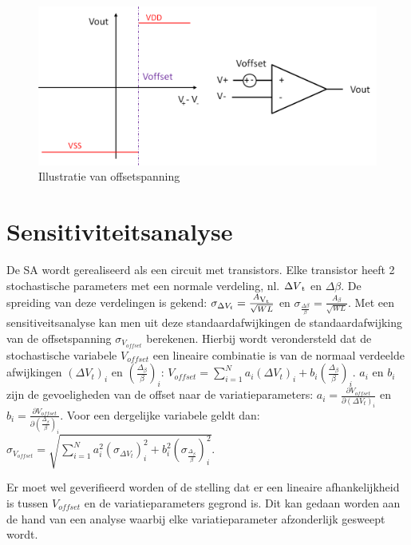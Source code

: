 \begin{figure}
  \centering
  \includegraphics[scale=0.4]{../fig/hfdstk-sensamp-offset.png}
  \caption[SA offsetspanning]{Illustratie van offsetspanning}
  \label{fig:offset}
\end{figure}

\section{Sensitiviteitsanalyse}
De SA wordt gerealiseerd als een circuit met transistors. Elke transistor heeft 2 stochastische parameters met een normale verdeling, nl. $\Delta V\textsubscript{t}$ en $\Delta \beta$. De spreiding van deze verdelingen is gekend: $\sigma_{\Delta V_{t}} = \frac{A\textsubscript{V\textsubscript{t}}}{\sqrt{W L}}$ en $\sigma_\frac{{\Delta \beta}}{\beta} = \frac{A_{\beta}}{\sqrt{W L}}$. Met een sensitiveitsanalyse kan men uit deze standaardafwijkingen de standaardafwijking van de offsetspanning $\sigma_{V_{offset}}$ berekenen. Hierbij wordt verondersteld dat de stochastische variabele $V_{offset}$ een lineaire combinatie is van de normaal verdeelde afwijkingen $(\Delta V_{t})_{i}$ en $(\frac{\Delta_{\beta}}{\beta})_{i}$: $V_{offset}=\sum\limits_{i=1}^{N} a_{i} (\Delta V_{t})_{i} + b_{i} (\frac{\Delta_{\beta}}{\beta})_{i}$.
$a_{i}$ en $b_{i}$ zijn de gevoeligheden van de offset naar de variatieparameters: $a_{i}=\frac{\partial V_{offset}}{\partial (\Delta V_{t})_{i}}$ en $b_{i}=\frac{\partial V_{offset}}{\partial (\frac{\Delta_{\beta}}{\beta})_{i}}$.
Voor een dergelijke variabele geldt dan: $\sigma_{V_{offset}}=\sqrt{\sum\limits_{i=1}^{N} a_{i}^{2} (\sigma_{\Delta V_{t}})_{i}^{2} + b_{i}^{2} (\sigma_{\frac{\Delta_{\beta}}{\beta}})_{i}^{2}}$.

Er moet wel geverifieerd worden of de stelling dat er een lineaire afhankelijkheid is tussen $V_{offset}$ en de variatieparameters gegrond is.
Dit kan gedaan worden aan de hand van een analyse waarbij elke variatieparameter afzonderlijk gesweept wordt. 

